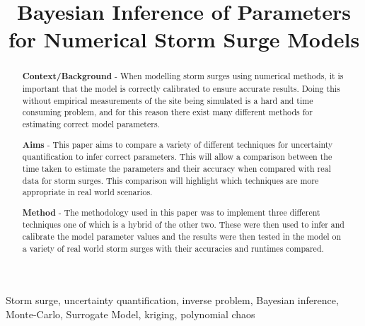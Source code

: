 \documentclass[12pt,a4paper]{article}
\title{Bayesian Inference of Parameters for Numerical Storm Surge Models}
\author{} %
\date{}
\begin{document}
\maketitle

\begin{abstract}
	
{\bf Context/Background} - 	When modelling storm surges using numerical methods, it is important that the model is correctly calibrated to ensure accurate results. Doing this without empirical measurements of the site being simulated is a hard and time consuming problem, and for this reason there exist many different methods for estimating correct model parameters.

{\bf Aims} - This paper aims to compare a variety of different techniques for uncertainty quantification to infer correct parameters. This will allow a comparison between the time taken to estimate the parameters and their accuracy when compared with real data for storm surges. This comparison will highlight which techniques are more appropriate in real world scenarios.

{\bf Method} - The methodology used in this paper was to implement three different techniques one of which is a hybrid of the other two. These were then used to infer and calibrate the model parameter values and the results were then tested in the model on a variety of real world storm surges with their accuracies and runtimes compared.
\end{abstract}

\begin{keywords}
Storm surge, uncertainty quantification, inverse problem, Bayesian inference, Monte-Carlo, Surrogate Model, kriging, polynomial chaos
\end{keywords}
\end{document}
